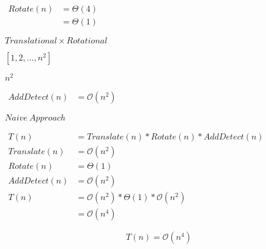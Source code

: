 \documentclass[10pt]{book}
\begin{document}
\begin{mdSnippets}
\begin{mdInlineSnippet}[b4bd1bea6544686c131629943311723c]%
$\begin{aligned}Rotate(n) &= \Theta(4)\\&= \Theta(1)\end{aligned}$\end{mdInlineSnippet}%
\begin{mdInlineSnippet}%
$Translational \times Rotational$\end{mdInlineSnippet}%
\begin{mdInlineSnippet}%
$[1, 2, \dots, n^2]$\end{mdInlineSnippet}%
\begin{mdInlineSnippet}[6595d679e306a127a3fe53268bcaddb2]%
$n^2$\end{mdInlineSnippet}%
\begin{mdInlineSnippet}[7584840944b3e1d1c6cd51dac556b8f7]%
$\begin{aligned}AddDetect(n) &= \mathcal{O}(n^2)\end{aligned}$\end{mdInlineSnippet}%
\begin{mdInlineSnippet}[be3f06595012e1b8491f993a03d695fd]%
$Naive~Approach$\end{mdInlineSnippet}%
\begin{mdInlineSnippet}[b21f776fc1b2d5430fb9925d6a6f0c48]%
$\begin{aligned}T(n) &= Translate(n) * Rotate(n) * AddDetect(n)\\Translate(n) &= \mathcal{O}(n^2)\\ Rotate(n) &= \Theta(1)\\AddDetect(n) &= \mathcal{O}(n^2)\\T(n) &= \mathcal{O}(n^2) * \Theta(1) * \mathcal{O}(n^2)\\&= \mathcal{O}(n^4)\end{aligned}$\end{mdInlineSnippet}%
\begin{mdDisplaySnippet}%
\[%
  T(n) = \mathcal{O}(n^4)
\]%
\end{mdDisplaySnippet}%
\begin{mdInlineSnippet}[9d528e438fd00b69e5f1d9b8b3d422ed]%

\end{mdInlineSnippet}
\end{mdSnippets}
\end{document}
